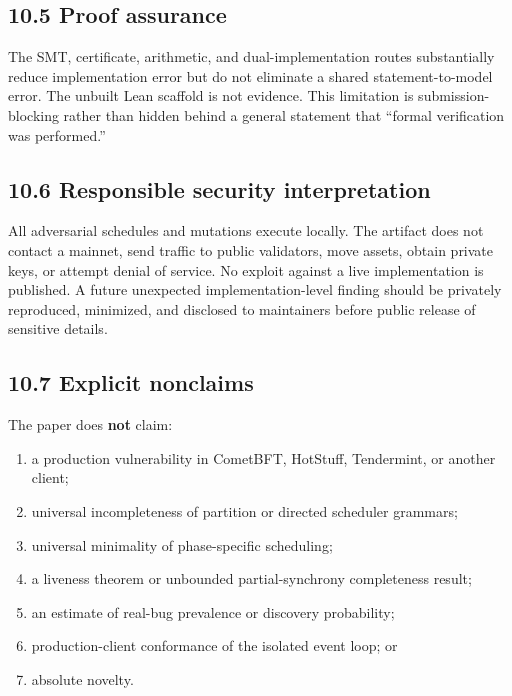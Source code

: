 \documentclass[10pt,a4paper]{article}
\newcommand{\tightlist}{\setlength{\itemsep}{0pt}\setlength{\parskip}{0pt}}
\begin{document}
\subsection{10.5 Proof assurance}\label{proof-assurance}

The SMT, certificate, arithmetic, and dual-implementation routes
substantially reduce implementation error but do not eliminate a shared
statement-to-model error. The unbuilt Lean scaffold is not evidence.
This limitation is submission-blocking rather than hidden behind a
general statement that ``formal verification was performed.''

\subsection{10.6 Responsible security
interpretation}\label{responsible-security-interpretation}

All adversarial schedules and mutations execute locally. The artifact
does not contact a mainnet, send traffic to public validators, move
assets, obtain private keys, or attempt denial of service. No exploit
against a live implementation is published. A future unexpected
implementation-level finding should be privately reproduced, minimized,
and disclosed to maintainers before public release of sensitive details.

\subsection{10.7 Explicit nonclaims}\label{explicit-nonclaims}

The paper does \textbf{not} claim:

\begin{enumerate}
\def\labelenumi{\arabic{enumi}.}
\tightlist
\item
  a production vulnerability in CometBFT, HotStuff, Tendermint, or
  another client;
\item
  universal incompleteness of partition or directed scheduler grammars;
\item
  universal minimality of phase-specific scheduling;
\item
  a liveness theorem or unbounded partial-synchrony completeness result;
\item
  an estimate of real-bug prevalence or discovery probability;
\item
  production-client conformance of the isolated event loop; or
\item
  absolute novelty.
\end{enumerate}
\end{document}
